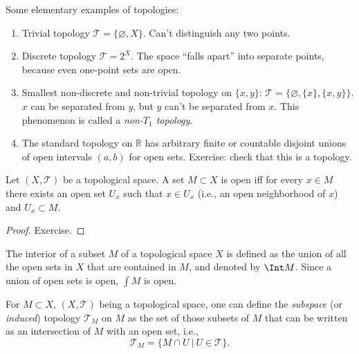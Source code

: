 \begin{example} Some elementary examples of topologies:
\begin{enumerate}
    \item Trivial topology $\mathcal T=\{\varnothing,X\}$. Can't distinguish any two points.
    \item Discrete topology $\mathcal T=2^X$. The space ``falls apart'' into separate points, because even one-point sets are open.
    \item Smallest non-discrete and non-trivial topology on $\{x,y\}$: $\mathcal{T}=\{\varnothing,\{x\},\{x,y\}\}$. $x$ can be separated from $y$, but $y$ can't be separated from $x$. This phenomenon is called a \emph{non-$T_1$ topology}.
    \item The standard topology on $\mathbb R$ has arbitrary finite or countable disjoint unions of open intervals $(a,b)$ for open sets. Exercise: check that this is a topology.
\end{enumerate}
\end{example}
\begin{prop}\label{open iff contains neighborhoods}
Let $(X,\mathcal{T})$ be a topological space. A set $M\subset X$ is open iff for every $x\in M$ there exists an open set $U_x$ such that $x\in U_x$ (i.e., an open neighborhood of $x$) and $U_x\subset M$.
\end{prop}
\begin{proof}
Exercise.
\end{proof}

\begin{defn}[Interior]
The interior of a subset $M$ of a topological space $X$ is defined as the union of all the open sets in $X$ that are contained in $M$, and denoted by $\Int M$. Since a union of open sets is open, $\int M$ is open.
\end{defn}


\begin{defn}
For $M\subset X$, $(X,\mathcal{T})$ being a topological space, one can define the \emph{subspace} (or \emph{induced}) topology $\mathcal{T}_M$ on $M$ as the set of those subsets of $M$ that can be written as an intersection of $M$ with an open set, i.e.,
\begin{equation}
    \mathcal{T}_M = \{ M\cap U ~|~ U\in \mathcal{T} \}.
\end{equation}
\end{defn}

